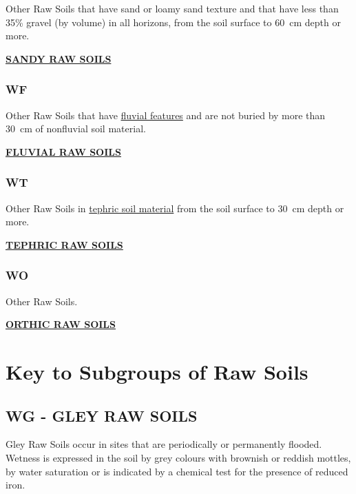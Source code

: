 \documentclass[
  letterpaper,
  DIV=11,
  numbers=noendperiod]{scrreprt}
\begin{document}
Other Raw Soils that have sand or loamy sand texture and that have less
than 35\% gravel (by volume) in all horizons, from the soil surface to
60~cm depth or more.

\protect\hyperlink{sec-WS}{\textbf{SANDY RAW SOILS}}

\hypertarget{sec-key-WF}{%
\subsubsection{\texorpdfstring{\textbf{WF}}{WF}}\label{sec-key-WF}}

Other Raw Soils that have \protect\hyperlink{sec-diag-fluv}{fluvial
features} and are not buried by more than 30~cm of non­fluvial soil
material.

\protect\hyperlink{sec-WF}{\textbf{FLUVIAL RAW SOILS}}

\hypertarget{sec-key-WT}{%
\subsubsection{\texorpdfstring{\textbf{WT}}{WT}}\label{sec-key-WT}}

Other Raw Soils in \protect\hyperlink{sec-diag-teph}{tephric soil
material} from the soil surface to 30~cm depth or more.

\protect\hyperlink{sec-WT}{\textbf{TEPHRIC RAW SOILS}}

\hypertarget{sec-key-WO}{%
\subsubsection{\texorpdfstring{\textbf{WO}}{WO}}\label{sec-key-WO}}

Other Raw Soils.

\protect\hyperlink{sec-WO}{\textbf{ORTHIC RAW SOILS}}

\hypertarget{sec-sub-W}{%
\section{Key to Subgroups of Raw Soils}\label{sec-sub-W}}

\hypertarget{sec-WG}{%
\subsection{\texorpdfstring{\textbf{WG} - GLEY RAW
SOILS}{WG - GLEY RAW SOILS}}\label{sec-WG}}

Gley Raw Soils occur in sites that are periodically or permanently
flooded. Wetness is expressed in the soil by grey colours with brownish
or reddish mottles, by water saturation or is indicated by a chemical
test for the presence of reduced iron.
\end{document}
